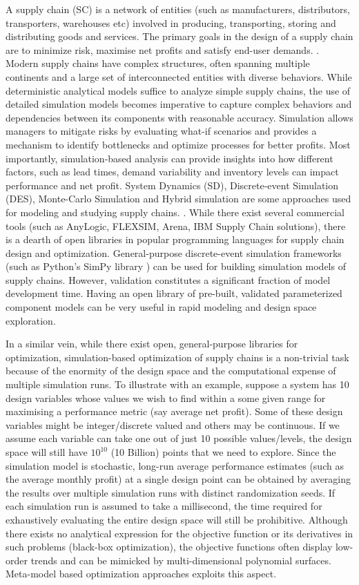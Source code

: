 A supply chain (SC) is a network of entities (such as manufacturers, distributors, transporters, warehouses etc) involved in producing, transporting, storing and distributing goods and services. The primary goals in the design of a supply chain are to minimize risk, maximise net profits and satisfy end-user demands. \cite{chopra2007supply}. Modern supply chains have complex structures, often spanning multiple continents and a large set of interconnected entities with diverse behaviors. While deterministic analytical models suffice to analyze simple supply chains, the use of detailed simulation models becomes imperative to capture complex behaviors and dependencies between its components with reasonable accuracy. Simulation allows managers to mitigate risks by evaluating what-if scenarios and provides a mechanism to identify bottlenecks and optimize processes for better profits. Most importantly, simulation-based analysis can provide insights into how different factors, such as lead times, demand variability and inventory levels can impact performance and net profit.
System Dynamics (SD), Discrete-event Simulation (DES), Monte-Carlo Simulation and Hybrid simulation are some approaches used for modeling and studying supply chains. \cite{Mustafee}. 
%
While there exist several commercial tools (such as AnyLogic, FLEXSIM, Arena, IBM Supply Chain solutions), there is a dearth of open libraries in popular programming languages for supply chain design and optimization.  General-purpose discrete-event simulation frameworks (such as Python's SimPy library \cite{SimPy} ) can be used for building simulation models of supply chains. However, validation constitutes a significant fraction of model development time. Having an open library of  pre-built, validated parameterized component models can be very useful in rapid modeling and design space exploration.  

In a similar vein, while there exist open, general-purpose libraries for optimization, simulation-based optimization of supply chains is a non-trivial task because of the enormity of the design space and the computational expense of multiple simulation runs. 
%
To illustrate with an example, suppose a system has 10 design variables whose values we wish to find within a some given range for maximising a performance metric (say average net profit).  Some of these design variables might be integer/discrete valued and others may be continuous. If we assume each variable can take one out of  just 10 possible values/levels, the design space will still have $10^{10}$ (10 Billion) points  that we need to explore. Since the simulation model is stochastic, long-run average performance estimates (such as the average monthly profit) at a single design point can be obtained by averaging the results over multiple simulation runs with distinct randomization seeds. If each simulation run is assumed to take a millisecond, the time required for exhaustively evaluating the entire design space will still be prohibitive. Although there exists no analytical expression for the objective function or its derivatives in such problems (black-box optimization), the objective functions often display low-order trends and can be mimicked by multi-dimensional polynomial surfaces. Meta-model based optimization approaches exploits this aspect.

